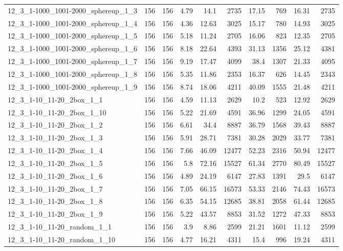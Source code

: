 \begin{center}
\begin{scriptsize}
\begin{longtable}{lrrrrrrrrr}
12\_3\_1-1000\_1001-2000\_sphereup\_1\_3 & 156 & 156 & 4.79 & 14.1 & 2735 & 17.15 & 769 & 16.31 & 2735\\
12\_3\_1-1000\_1001-2000\_sphereup\_1\_4 & 156 & 156 & 4.36 & 12.63 & 3025 & 15.17 & 780 & 14.93 & 3025\\
12\_3\_1-1000\_1001-2000\_sphereup\_1\_5 & 156 & 156 & 5.18 & 11.24 & 2705 & 16.06 & 823 & 12.35 & 2705\\
12\_3\_1-1000\_1001-2000\_sphereup\_1\_6 & 156 & 156 & 8.18 & 22.64 & 4393 & 31.13 & 1356 & 25.12 & 4381\\
12\_3\_1-1000\_1001-2000\_sphereup\_1\_7 & 156 & 156 & 9.19 & 17.47 & 4099 & 38.4 & 1307 & 21.33 & 4095\\
12\_3\_1-1000\_1001-2000\_sphereup\_1\_8 & 156 & 156 & 5.35 & 11.86 & 2353 & 16.37 & 626 & 14.45 & 2343\\
12\_3\_1-1000\_1001-2000\_sphereup\_1\_9 & 156 & 156 & 8.74 & 18.06 & 4211 & 40.09 & 1555 & 21.48 & 4211\\
12\_3\_1-10\_11-20\_2box\_1\_1 & 156 & 156 & 4.59 & 11.13 & 2629 & 10.2 & 523 & 12.92 & 2629\\
12\_3\_1-10\_11-20\_2box\_1\_10 & 156 & 156 & 5.22 & 21.69 & 4591 & 36.96 & 1299 & 24.05 & 4591\\
12\_3\_1-10\_11-20\_2box\_1\_2 & 156 & 156 & 6.61 & 34.4 & 8887 & 36.79 & 1568 & 39.43 & 8887\\
12\_3\_1-10\_11-20\_2box\_1\_3 & 156 & 156 & 5.91 & 28.71 & 7381 & 30.28 & 2029 & 33.77 & 7381\\
12\_3\_1-10\_11-20\_2box\_1\_4 & 156 & 156 & 7.66 & 46.09 & 12477 & 52.23 & 2316 & 50.94 & 12477\\
12\_3\_1-10\_11-20\_2box\_1\_5 & 156 & 156 & 5.8 & 72.16 & 15527 & 61.34 & 2770 & 80.49 & 15527\\
12\_3\_1-10\_11-20\_2box\_1\_6 & 156 & 156 & 4.89 & 24.19 & 6147 & 27.83 & 1391 & 29.5 & 6147\\
12\_3\_1-10\_11-20\_2box\_1\_7 & 156 & 156 & 7.05 & 66.15 & 16573 & 53.33 & 2146 & 74.43 & 16573\\
12\_3\_1-10\_11-20\_2box\_1\_8 & 156 & 156 & 6.35 & 54.15 & 12685 & 38.81 & 2058 & 61.44 & 12685\\
12\_3\_1-10\_11-20\_2box\_1\_9 & 156 & 156 & 5.22 & 43.57 & 8853 & 31.52 & 1272 & 47.33 & 8853\\
12\_3\_1-10\_11-20\_random\_1\_1 & 156 & 156 & 3.9 & 8.86 & 2599 & 21.21 & 1601 & 11.12 & 2599\\
12\_3\_1-10\_11-20\_random\_1\_10 & 156 & 156 & 4.77 & 16.21 & 4311 & 15.4 & 996 & 19.24 & 4311\\

\end{longtable}
\end{scriptsize}
\end{center}
